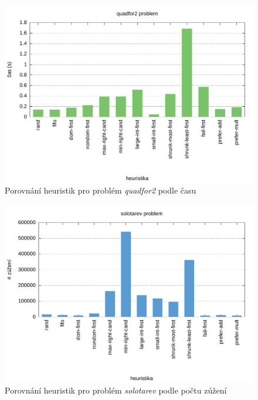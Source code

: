 {\begin{figure}[H]
\centering
\includegraphics[scale=0.68]{chart/quadfor2_time.pdf}
\caption{Porovnání heuristik pro problém \emph{quadfor2} podle času}
\end{figure}

\begin{figure}[H]
\centering
\includegraphics[scale=0.68]{chart/solotarev_nar.pdf}
\caption{Porovnání heuristik pro problém \emph{solotarev} podle počtu zúžení}
\end{figure}

}
